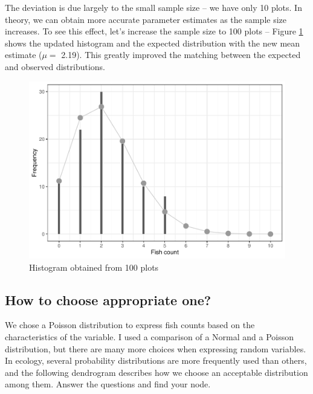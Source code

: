 \documentclass[
]{book}
\begin{document}
The deviation is due largely to the small sample size -- we have only 10 plots. In theory, we can obtain more accurate parameter estimates as the sample size increases. To see this effect, let's increase the sample size to 100 plots -- Figure \ref{fig:full-count} shows the updated histogram and the expected distribution with the new mean estimate (\(\mu =\) 2.19). This greatly improved the matching between the expected and observed distributions.

\begin{figure}

{\centering \includegraphics{_main_files/figure-latex/full-count-1} 

}

\caption{Histogram obtained from 100 plots}\label{fig:full-count}
\end{figure}

\hypertarget{how-to-choose-appropriate-one}{%
\subsection{How to choose appropriate one?}\label{how-to-choose-appropriate-one}}

We chose a Poisson distribution to express fish counts based on the characteristics of the variable. I used a comparison of a Normal and a Poisson distribution, but there are many more choices when expressing random variables. In ecology, several probability distributions are more frequently used than others, and the following dendrogram describes how we choose an acceptable distribution among them. Answer the questions and find your node.
\end{document}
